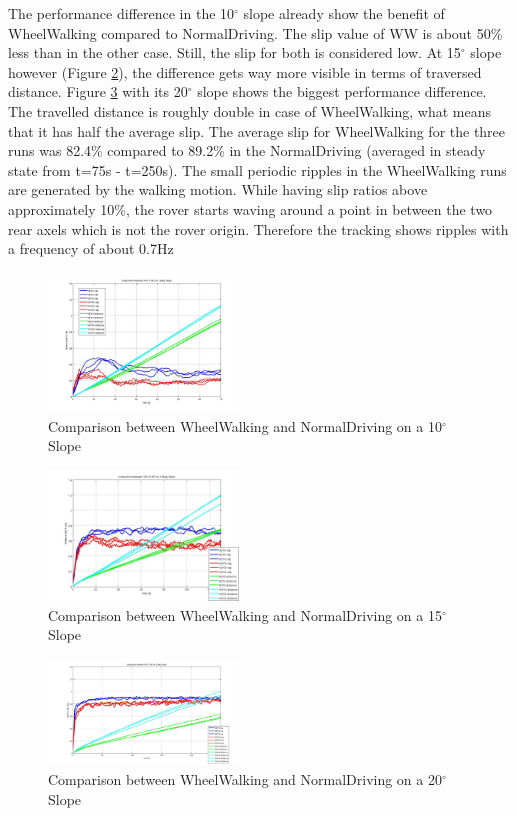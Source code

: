 \documentclass[a4paper,twocolumn]{esapub2005} %
\begin{document}
The performance difference in the 10$^\circ$ slope already show the benefit of WheelWalking compared to NormalDriving. The slip value of WW is about 50\% less than in the other case. Still, the slip for both is considered low.
At 15$^\circ$ slope however (Figure \ref{fig:15d}), the difference gets way more visible in terms of traversed distance. 
Figure \ref{fig:20d} with its 20$^\circ$ slope shows the biggest performance difference. The travelled distance is roughly double in case of WheelWalking, what means that it has half the average slip. The average slip for WheelWalking for the three runs was 82.4\% compared to 89.2\% in the NormalDriving (averaged in steady state from t=75s - t=250s). 
The small periodic ripples in the WheelWalking runs are generated by the walking motion. While having slip ratios above approximately 10\%, the rover starts waving around a point in between the two rear axels which is not the rover origin. Therefore the tracking shows ripples with a frequency of about 0.7Hz

\begin{figure}[h!]
	\centering		\includegraphics[width=0.45\textwidth]{10d.JPG}	
	\caption{Comparison between WheelWalking and NormalDriving on a 10$^{\circ}$ Slope}
	\label{fig:10d}
\end{figure}

\begin{figure}[h!]
	\centering		\includegraphics[width=0.45\textwidth]{15d.JPG}	
	\caption{Comparison between WheelWalking and NormalDriving on a 15$^{\circ}$ Slope}
	\label{fig:15d}
\end{figure}

\begin{figure}[h!]
	\centering		\includegraphics[width=0.45\textwidth]{20d.JPG}	
	\caption{Comparison between WheelWalking and NormalDriving on a 20$^{\circ}$ Slope}
	\label{fig:20d}
\end{figure}
\end{document}
